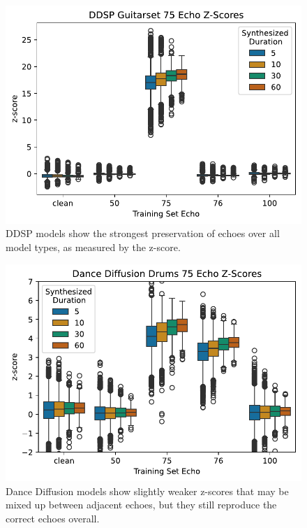 \documentclass[letterpaper]{article} %
\begin{document}
\begin{figure}
    \centering
    \includegraphics[width=\columnwidth]{figs/DDSPZScoreExamples.pdf}
    \caption{DDSP models show the strongest preservation of echoes over all model types, as measured by the z-score.}
    \label{fig:ddspzscoreexamples}
\end{figure}

\begin{figure}
    \centering
    \includegraphics[width=\columnwidth]{figs/DanceDiffusionZScoreExamples.pdf}
    \caption{Dance Diffusion models show slightly weaker z-scores that may be mixed up between adjacent echoes, but they still reproduce the correct echoes overall.}
    \label{fig:dancediffusionzscoreexamples}
\end{figure}
\end{document}
